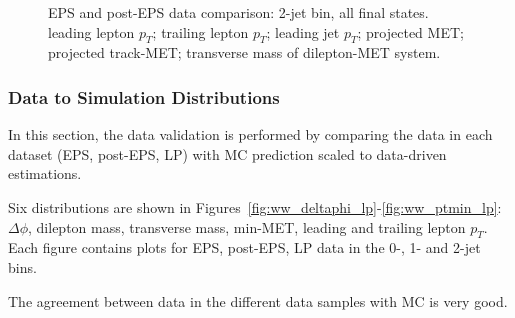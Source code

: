 \begin{figure}[!hbtp]
\caption{EPS and post-EPS data comparison: 2-jet bin, all final states. 
 leading lepton $p_T$;
 trailing lepton $p_T$;
 leading jet $p_T$;
 projected MET;
 projected track-MET;
 transverse mass of dilepton-MET system.
}
\label{fig:lp_ww2j_lepjetmet}
\end{figure}

\clearpage

\subsubsection{Data to Simulation Distributions}

In this section, the data validation is performed by comparing the data in each dataset (EPS, post-EPS, LP) with MC prediction scaled to 
data-driven estimations.

Six distributions are shown in Figures~\ref{fig:ww_deltaphi_lp}-\ref{fig:ww_ptmin_lp}: $\Delta\phi$, dilepton mass, transverse mass, 
min-MET, leading and trailing lepton $p_T$. Each figure contains plots for EPS, post-EPS, LP data in the 0-, 1- and 2-jet bins.

The agreement between data in the different data samples with MC is very good.

